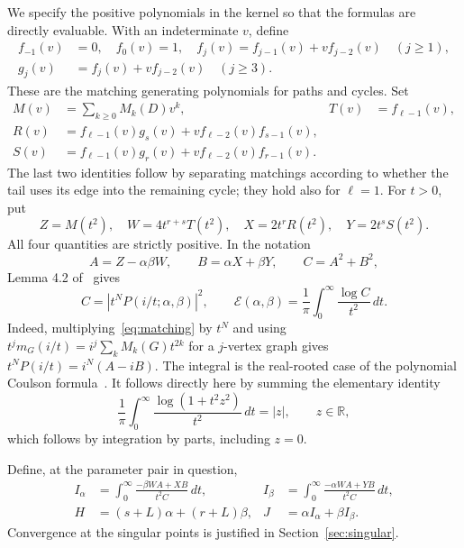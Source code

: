 \documentclass[11pt,a4paper]{article}
\theoremstyle{remark}
\newcommand{\dd}{\,dt}
\newcommand{\E}{\mathcal E}
\newcommand{\R}{\mathbb R}
\begin{document}
We specify the positive polynomials in the kernel so that the formulas
are directly evaluable. With an indeterminate $v$, define
\begin{align*}
 f_{-1}(v)&=0,\quad f_0(v)=1,\quad
 f_j(v)=f_{j-1}(v)+vf_{j-2}(v)\quad(j\geq1),\\
 g_j(v)&=f_j(v)+vf_{j-2}(v)\quad(j\geq3).
\end{align*}
These are the matching generating polynomials for paths and cycles.
Set
\begin{align*}
 M(v)&=\sum_{k\geq0}M_k(D)v^k,& T(v)&=f_{\ell-1}(v),\\
 R(v)&=f_{\ell-1}(v)g_s(v)+vf_{\ell-2}(v)f_{s-1}(v),\\
 S(v)&=f_{\ell-1}(v)g_r(v)+vf_{\ell-2}(v)f_{r-1}(v).
\end{align*}
The last two identities follow by separating matchings according to
whether the tail uses its edge into the remaining cycle; they hold
also for $\ell=1$. For $t>0$, put
\begin{equation}\label{eq:polynomials}
 Z=M(t^2),\quad W=4t^{r+s}T(t^2),\quad
 X=2t^rR(t^2),\quad Y=2t^sS(t^2).
\end{equation}
All four quantities are strictly positive. In the notation
\begin{equation}\label{eq:kernel}
 A=Z-\alpha\beta W,\qquad B=\alpha X+\beta Y,\qquad C=A^2+B^2,
\end{equation}
Lemma 4.2 of~\cite{HuangPereyra2026} gives
\begin{equation}\label{eq:energy-integral}
 C=|t^NP(i/t;\alpha,\beta)|^2,\qquad
 \E(\alpha,\beta)=\frac1\pi\int_0^\infty\frac{\log C}{t^2}\dd .
\end{equation}
Indeed, multiplying~\eqref{eq:matching} by $t^N$ and using
$t^j m_G(i/t)=i^j\sum_k M_k(G)t^{2k}$ for a $j$-vertex graph gives
$t^NP(i/t)=i^N(A-iB)$. The integral is the real-rooted case of the
polynomial Coulson formula~\cite[Theorem 1]{MateljevicBozinGutman2010}.
It follows directly here by summing the elementary identity
\begin{equation}\label{eq:scalar-integral}
 \frac1\pi\int_0^\infty
       \frac{\log(1+t^2z^2)}{t^2}\dd=|z|,\qquad z\in\R,
\end{equation}
which follows by integration by parts, including $z=0$.

Define, at the parameter pair in question,
\begin{align}
 I_\alpha&=\int_0^\infty\frac{-\beta WA+XB}{t^2C}\dd,&
 I_\beta&=\int_0^\infty\frac{-\alpha WA+YB}{t^2C}\dd,\label{eq:integrals}\\
 H&=(s+L)\alpha+(r+L)\beta,&
 J&=\alpha I_\alpha+\beta I_\beta.\label{eq:HJ}
\end{align}
Convergence at the singular points is justified in Section~\ref{sec:singular}.
\end{document}
